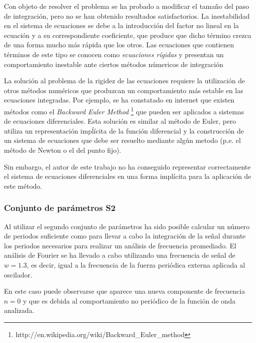 \documentclass[11pt]{article}
\begin{document}
Con objeto de resolver el problema se ha probado a modificar el tamaño del paso
de integración, pero no se han obtenido resultados satisfactorios. La
inestabilidad en el sistema de ecuaciones se debe a la introducción del factor
no lineal en la ecuación y a su correspondiente coeficiente, que produce que
dicho término crezca de una forma mucho más rápida que los otros. Las
ecuaciones que contienen términos de este tipo se conocen como
\textit{ecuaciones rígidas} y presentan un comportamiento inestable ante ciertos
métodos númericos de integración

La solución al problema de la rigidez de las ecuaciones requiere la utilización
de otros métodos numéricos que produzcan un comportamiento más estable en las
ecuaciones integradas. Por ejemplo, se ha constatado en internet que existen
métodos como el \textit{Backward Euler Method}
\footnote{http://en.wikipedia.org/wiki/Backward\_Euler\_method } que pueden ser
aplicados a sistemas de ecuaciones diferenciales. Esta solución es similar al
método de Euler, pero utiliza un representación impĺícita de la función
diferencial y la construcción de un sistema de ecuaciones que debe ser resuelto
mediante algún metodo (p.e. el método de Newton o el del punto fijo). 

Sin embargo, el autor de este trabajo no ha conseguido representar correctamente
el sistema de ecuaciones diferenciales en una forma implícita para la aplicación
de este método.

\subsubsection{Conjunto de parámetros S2}
Al utilizar el segundo conjunto de parámetros ha sido posible calcular un número
de periodos suficiente como para llevar a cabo la integración de la señal
durante los periodos necesarios para realizar un análisis de frecuencia
promediado. El análisis de Fourier se ha llevado a cabo utilizando una
frecuencia de señal de $w=1.3$, es decir, igual a la frecuencia de la fuerza
periódica externa aplicada al oscilador.

En este caso puede observarse que aparece una nueva componente de frecuencia
$n=0$ y que es debida al comportamiento no periódico de la función de onda
analizada.
\end{document}
